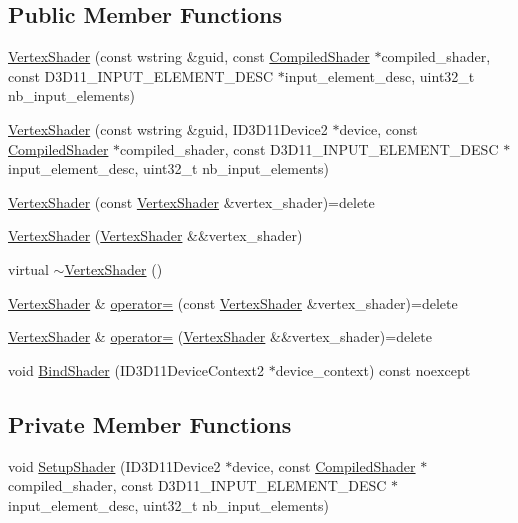 \subsection*{Public Member Functions}
\begin{DoxyCompactItemize}
\item 
\hyperlink{classmage_1_1_vertex_shader_a95e00fc26b45cd53e8f1a6fec67ce942}{Vertex\+Shader} (const wstring \&guid, const \hyperlink{structmage_1_1_compiled_shader}{Compiled\+Shader} $\ast$compiled\+\_\+shader, const D3\+D11\+\_\+\+I\+N\+P\+U\+T\+\_\+\+E\+L\+E\+M\+E\+N\+T\+\_\+\+D\+E\+SC $\ast$input\+\_\+element\+\_\+desc, uint32\+\_\+t nb\+\_\+input\+\_\+elements)
\item 
\hyperlink{classmage_1_1_vertex_shader_a9ab877ac0e88373bd95ad14259c8a2f8}{Vertex\+Shader} (const wstring \&guid, I\+D3\+D11\+Device2 $\ast$device, const \hyperlink{structmage_1_1_compiled_shader}{Compiled\+Shader} $\ast$compiled\+\_\+shader, const D3\+D11\+\_\+\+I\+N\+P\+U\+T\+\_\+\+E\+L\+E\+M\+E\+N\+T\+\_\+\+D\+E\+SC $\ast$input\+\_\+element\+\_\+desc, uint32\+\_\+t nb\+\_\+input\+\_\+elements)
\item 
\hyperlink{classmage_1_1_vertex_shader_a713f8581278ea2e5eb3010207b7e42a8}{Vertex\+Shader} (const \hyperlink{classmage_1_1_vertex_shader}{Vertex\+Shader} \&vertex\+\_\+shader)=delete
\item 
\hyperlink{classmage_1_1_vertex_shader_adb9497fa9e712c3b7c94d377408c24f3}{Vertex\+Shader} (\hyperlink{classmage_1_1_vertex_shader}{Vertex\+Shader} \&\&vertex\+\_\+shader)
\item 
virtual \hyperlink{classmage_1_1_vertex_shader_aa475ad31613dd20fdcc4930409fd0cfd}{$\sim$\+Vertex\+Shader} ()
\item 
\hyperlink{classmage_1_1_vertex_shader}{Vertex\+Shader} \& \hyperlink{classmage_1_1_vertex_shader_a0094f5c2adb8377fa5c8d52e7a65136f}{operator=} (const \hyperlink{classmage_1_1_vertex_shader}{Vertex\+Shader} \&vertex\+\_\+shader)=delete
\item 
\hyperlink{classmage_1_1_vertex_shader}{Vertex\+Shader} \& \hyperlink{classmage_1_1_vertex_shader_ada6250a89610e5649e0062c9a50fb78a}{operator=} (\hyperlink{classmage_1_1_vertex_shader}{Vertex\+Shader} \&\&vertex\+\_\+shader)=delete
\item 
void \hyperlink{classmage_1_1_vertex_shader_a04001136e86576cefff14b6a6d79c2d4}{Bind\+Shader} (I\+D3\+D11\+Device\+Context2 $\ast$device\+\_\+context) const noexcept
\end{DoxyCompactItemize}
\subsection*{Private Member Functions}
\begin{DoxyCompactItemize}
\item 
void \hyperlink{classmage_1_1_vertex_shader_aafa4042ef93aa13d1c2fb68c210aa3fe}{Setup\+Shader} (I\+D3\+D11\+Device2 $\ast$device, const \hyperlink{structmage_1_1_compiled_shader}{Compiled\+Shader} $\ast$compiled\+\_\+shader, const D3\+D11\+\_\+\+I\+N\+P\+U\+T\+\_\+\+E\+L\+E\+M\+E\+N\+T\+\_\+\+D\+E\+SC $\ast$input\+\_\+element\+\_\+desc, uint32\+\_\+t nb\+\_\+input\+\_\+elements)
\end{DoxyCompactItemize}
